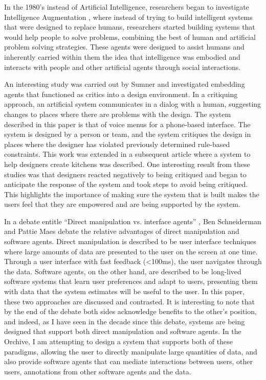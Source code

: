 \documentclass[12pt,oneside]{book}
\begin{document}
In the 1980's instead of Artificial Intelligence, researchers began to
investigate Intelligence Augmentation \cite{fischer1992beyond}, where
instead of trying to build intelligent systems that were designed to
replace humans, researchers started building systems that would help
people to solve problems, combining the best of human and artificial
problem solving strategies.  These agents were designed to assist
humans and inherently carried within them the idea that intelligence
was embodied and interacts with people and other artificial agents
through social interactions.

An interesting study was carried out by Sumner
\cite{sumner1997cognitive} and investigated embedding agents that
functioned as critics into a design environment.  In a critiquing
approach, an artificial system communicates in a dialog with a human,
suggesting changes to places where there are problems with the design.
The system described in this paper is that of voice menus for a
phone-based interface.  The system is designed by a person or team,
and the system critiques the design in places where the designer has
violated previously determined rule-based constraints.  This work was
extended in a subsequent article \cite{fischer98embedding} where a
system to help designers create kitchens was described.  One
interesting result from these studies was that designers reacted
negatively to being critiqued and began to anticipate the response of
the system and took steps to avoid being critiqued.  This highlights
the importance of making sure the system that is built makes the users
feel that they are empowered and are being supported by the system.

In a debate entitle ``Direct manipulation vs. interface agents''
\cite{schneiderman1997direct}, Ben Schneiderman and Pattie Maes debate
the relative advantages of direct manipulation and software agents.
Direct manipulation is described to be user interface techniques where
large amounts of data are presented to the user on the screen at one
time.  Through a user interface with fast feedback (\textless100ms),
the user navigates through the data.  Software agents, on the other
hand, are described to be long-lived software systems that learn user
preferences and adapt to users, presenting them with data that the
system estimates will be useful to the user.  In this paper, these two
approaches are discussed and contrasted.  It is interesting to note
that by the end of the debate both sides acknowledge benefits to the
other's position, and indeed, as I have seen in the decade since this
debate, systems are being designed that support both direct
manipulation and software agents.  In the Orchive, I am attempting
to design a system that supports both of these paradigms, allowing the
user to directly manipulate large quantities of data, and also provide
software agents that can mediate interactions between users, other
users, annotations from other software agents and the data.
\end{document}
